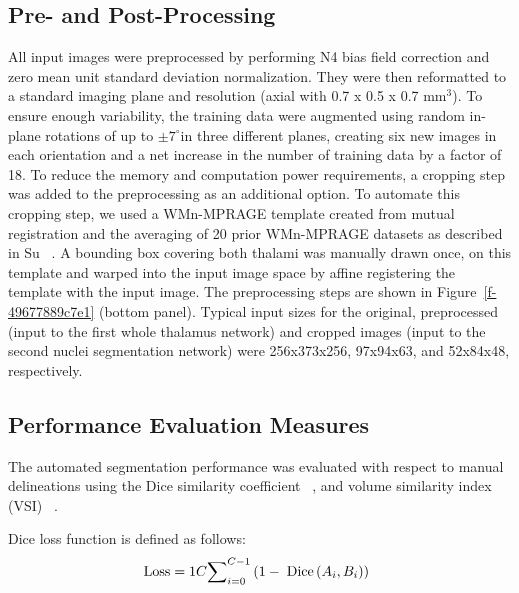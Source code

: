 \subsection{Pre- and Post-Processing}All input images were preprocessed by performing N4 bias field correction and zero mean unit standard deviation normalization. They were then reformatted to a standard imaging plane and resolution (axial with 0.7 x 0.5 x 0.7 mm\ensuremath{^{3}}). To ensure enough variability, the training data were augmented using random in-plane rotations of up to $\pm7^\circ $in three different planes, creating six new images in each orientation and a net increase in the number of training data by a factor of 18. To reduce the memory and computation power requirements, a cropping step was added to the preprocessing as an additional option. To automate this cropping step, we used a WMn-MPRAGE template created from mutual registration and the averaging of 20 prior WMn-MPRAGE datasets as described in Su \unskip~\cite{1643371:26789960}. A bounding box covering both thalami was manually drawn once, on this template and warped into the input image space by affine registering the template with the input image. The preprocessing steps are shown in Figure~\ref{f-49677889c7e1}  (bottom panel). Typical input sizes for the original, preprocessed (input to the first whole thalamus network) and cropped images (input to the second nuclei segmentation network) were 256x373x256, 97x94x63, and 52x84x48, respectively.



\subsection{Performance Evaluation Measures}The automated segmentation performance was evaluated with respect to manual delineations using the Dice similarity coefficient \unskip~\cite{1643371:26789928}, and volume similarity index (VSI) \unskip~\cite{1643371:26789960}. 

Dice loss function is defined as follows:
\let\saveeqnno\theequation
\let\savefrac\frac
\def\dispfrac{\displaystyle\savefrac}
\begin{eqnarray}
\let\frac\dispfrac
\gdef\theequation{1}
\let\theHequation\theequation
\label{disp-formula-group-f73e8e30e04042bea52de88dd1c0e353}
\begin{array}{@{}l}\text{Loss}=\frac1C{\sum\nolimits_{i=0}^{C-1}{(1-\;\text{Dice}\left(A_i,B_i)\right)}}\end{array}
\end{eqnarray}
\global\let\theequation\saveeqnno
\addtocounter{equation}{-1}\ignorespaces 

